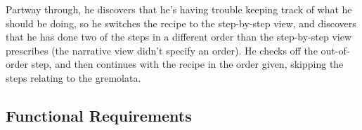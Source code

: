 Partway through, he discovers that he's having trouble keeping track of what he
should be doing, so he switches the recipe to the step-by-step view, and
discovers that he has done two of the steps in a different order than the 
step-by-step view prescribes (the narrative view didn't specify an order). He
checks off the out-of-order step, and then continues with the recipe in the
order given, skipping the steps relating to the gremolata.

\subsection{Functional Requirements}
